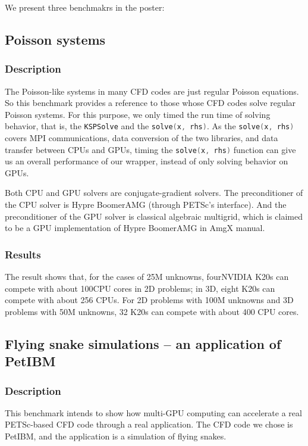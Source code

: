 We present three benchmakrs in the poster:

\subsection{Poisson systems}

    \subsubsection{Description}
    The Poisson-like systems in many CFD codes are just regular Poisson equations.
    So this benchmark provides a reference to those whose CFD codes solve regular Poisson systems.
    For this purpose, we only timed the run time of solving behavior, that is, the
    \lstinline[language=C++, basicstyle=\ttfamily]|KSPSolve| and the
    \lstinline[language=C++, basicstyle=\ttfamily]|solve(x, rhs)|.
    As the \lstinline[language=C++, basicstyle=\ttfamily]|solve(x, rhs)|
    covers MPI communications, data conversion of the two libraries, 
    and data transfer between CPUs and GPUs,
    timing the \lstinline[language=C++, basicstyle=\ttfamily]|solve(x, rhs)|
    function can give us an overall performance of our wrapper, instead of only 
    solving behavior on GPUs.

    Both CPU and GPU solvers are conjugate-gradient solvers.
    The preconditioner of the CPU solver is Hypre BoomerAMG 
    (through PETSc's interface).
    And the preconditioner of the GPU solver is classical algebraic multigrid, 
    which is claimed to be a GPU implementation of Hypre BoomerAMG in AmgX
    manual\cite[see][p.130]{amgx-manual}.

    \subsubsection{Results}
    The result shows that, for the cases of 25M unknowns,
    four\footnotemark[2] NVIDIA K20s can compete with about 100\footnotemark[3] 
    CPU cores in 2D problems;
    in 3D, eight K20s can compete with about 256 CPUs.
    For 2D problems with 100M unknowns and 3D problems with 50M unknowns,
    32 K20s can compete with about 400 CPU cores.

\subsection{Flying snake simulations -- an application of PetIBM}

    \subsubsection{Description}
    This benchmark intends to show how multi-GPU computing can accelerate a real
    PETSc-based CFD code through a real application.
    The CFD code we chose is PetIBM\cite{petibm-repo}, 
    and the application is a simulation of flying snakes\cite{Krishnan-2013-ID33}.

